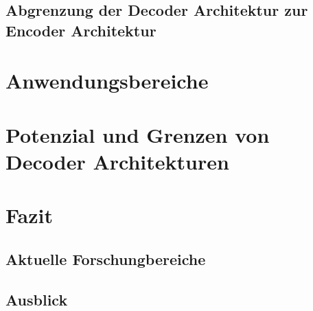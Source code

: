 \documentclass[conference]{IEEEtran}
\begin{document}
\subsection{Abgrenzung der Decoder Architektur zur Encoder Architektur}

\section{Anwendungsbereiche}

\section{Potenzial und Grenzen von Decoder Architekturen}


\section{Fazit}
\subsection{Aktuelle Forschungbereiche}
\subsection{Ausblick}





\end{document}

